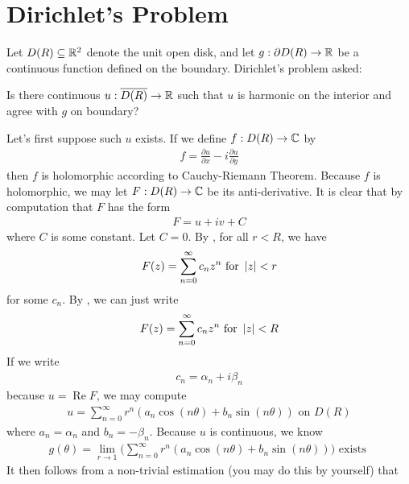 \documentclass{report}
\begin{document}
\section{Dirichlet's Problem}
\begin{mdframed}
Let $D(R)\subseteq \mathbb{R}^2$ denote the unit open disk, and let $g:\partial D(R) \rightarrow \mathbb{R}$ be a  continuous function defined on the boundary. Dirichlet's problem asked: 
\begin{center}
   \begin{minipage}{0.9\linewidth}  
Is there continuous $u: \overline{D(R)}\rightarrow \mathbb{R}$ such that $u$ is harmonic on the interior and agree with $g$ on boundary? 
   \end{minipage}
\end{center}
Let's first suppose such $u$ exists. If we define $f:D(R)\rightarrow \mathbb{C}$ by 
\begin{align*}
f= \frac{\partial u}{\partial x}- i \frac{\partial u}{\partial y}
\end{align*}
then $f$ is holomorphic according to Cauchy-Riemann Theorem. Because $f$ is holomorphic, we may let $F:D(R)\rightarrow \mathbb{C}$ be its anti-derivative. It is clear that by computation that $F$ has the form
\begin{align*}
F= u+iv +C
\end{align*}
where $C$ is some constant. Let $C=0$. By , for all $r<R$, we have 
 \begin{align*}
F(z)= \sum_{n=0}^{\infty} c_n z^n \text{ for }\left|z\right|<r
\end{align*}
for some $c_n$. By , we can just write 
\begin{align*}
F(z)=\sum_{n=0}^{\infty} c_nz^n \text{ for }\left|z\right|<R
\end{align*}
If we write 
 \begin{align*}
c_n = \alpha _n + i \beta _n 
\end{align*}
because $u=\operatorname{Re}F$, we may compute 
\begin{align*}
u= \sum_{n=0}^{\infty} r^n (a_n \cos (n\theta)+b_n \sin (n \theta))\text{ on }D(R)
\end{align*}
where $a_n=\alpha_n$ and $b_n=-\beta_n$. Because $u$ is continuous, we know 
 \begin{align}
\label{lk}
g(\theta)=\lim_{r\to 1} \Big(\sum_{n=0}^{\infty}r^n (a_n \cos (n \theta)+ b_n \sin (n\theta)) \Big)\text{ exists }
\end{align}
It then follows from a non-trivial estimation (you may do this by yourself) that 

\end{mdframed}
\end{document}
